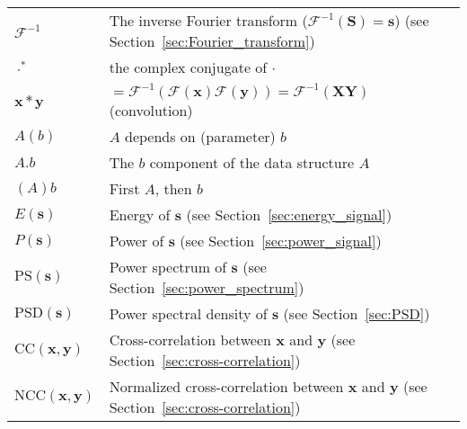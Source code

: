\documentclass{report}%
\begin{document}
\begin{tabular}{ll}
  $\mathcal{F}^{-1}$ & The inverse Fourier transform ($\mathcal{F}^{-1}(\mathbf{S})=\mathbf{s}$)  (see Section~\ref{sec:Fourier_transform})\\
  $\cdot^*$ & the complex conjugate of $\cdot$ \\
  $\mathbf{x}*\mathbf{y}$ & $=\mathcal{F}^{-1}(\mathcal{F}(\mathbf{x})\mathcal{F}(\mathbf{y}))=\mathcal{F}^{-1}(\mathbf{X}\mathbf{Y})$ (convolution) \\
  $A(b)$ & $A$ depends on (parameter) $b$ \\
  $A.b$ & The $b$ component of the data structure $A$ \\
  $(A)b$ & First $A$, then $b$ \\
  $E(\mathbf{s})$ & Energy of $\mathbf{s}$ (see Section~\ref{sec:energy_signal}) \\
  $P(\mathbf{s})$ & Power of $\mathbf{s}$ (see Section~\ref{sec:power_signal}) \\
  $\text{PS}(\mathbf{s})$ & Power spectrum of $\mathbf{s}$ (see Section~\ref{sec:power_spectrum}) \\
  $\text{PSD}(\mathbf{s})$ & Power spectral density of $\mathbf{s}$ (see Section~\ref{sec:PSD}) \\
  $\text{CC}(\mathbf{x},\mathbf{y})$ & Cross-correlation between $\mathbf{x}$ and $\mathbf{y}$ (see Section~\ref{sec:cross-correlation}) \\
  $\text{NCC}(\mathbf{x},\mathbf{y})$ & Normalized cross-correlation between $\mathbf{x}$ and $\mathbf{y}$ (see Section~\ref{sec:cross-correlation})
\end{tabular}













\end{document}
